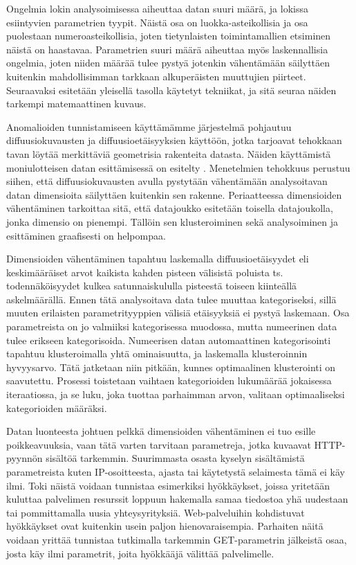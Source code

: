 Ongelmia lokin analysoimisessa aiheuttaa datan suuri määrä, ja lokissa esiintyvien parametrien tyypit. Näistä osa on luokka-asteikollisia ja osa puolestaan numeroasteikollisia, joten tietynlaisten toimintamallien 
etsiminen näistä on haastavaa. Parametrien suuri määrä aiheuttaa myös laskennallisia ongelmia, joten niiden määrää tulee pystyä jotenkin vähentämään säilyttäen kuitenkin mahdollisimman tarkkaan alkuperäisten muuttujien 
piirteet. Seuraavaksi esitetään yleisellä tasolla käytetyt tekniikat, ja sitä seuraa näiden tarkempi matemaattinen kuvaus.

Anomalioiden tunnistamiseen käyttämämme järjestelmä pohjautuu diffuusiokuvausten ja diffuusioetäisyyksien käyttöön, jotka tarjoavat tehokkaan tavan löytää merkittäviä geometrisia rakenteita datasta. Näiden
käyttämistä moniulotteisen datan esittämisessä on esitelty \cite{diff} \cite{diff2}. Menetelmien tehokkuus perustuu siihen, että diffuusiokuvausten avulla pystytään vähentämään analysoitavan datan dimensioita
säilyttäen kuitenkin sen rakenne. Periaatteessa dimensioiden vähentäminen tarkoittaa sitä, että datajoukko esitetään toisella datajoukolla, jonka dimensio on pienempi. Tällöin sen klusteroiminen sekä 
analysoiminen ja esittäminen graafisesti on helpompaa.

Dimensioiden vähentäminen tapahtuu laskemalla diffuusioetäisyydet eli keskimääräiset arvot kaikista kahden pisteen välisistä poluista ts. todennäköisyydet kulkea satunnaiskululla pisteestä toiseen kiinteällä
askelmäärällä. Ennen tätä analysoitava data tulee muuttaa kategoriseksi, sillä muuten erilaisten parametrityyppien välisiä etäisyyksiä ei pystyä laskemaan. Osa parametreista on jo valmiiksi kategorisessa 
muodossa, mutta numeerinen data tulee erikseen kategorisoida. Numeerisen datan automaattinen kategorisointi tapahtuu klusteroimalla yhtä ominaisuutta, ja laskemalla klusteroinnin hyvyysarvo. Tätä jatketaan niin pitkään,
kunnes optimaalinen klusterointi on saavutettu. Prosessi toistetaan vaihtaen kategorioiden lukumäärää jokaisessa iteraatiossa, ja se luku, joka tuottaa parhaimman arvon, valitaan optimaaliseksi kategorioiden 
määräksi.

Datan luonteesta johtuen pelkkä dimensioiden vähentäminen ei tuo esille poikkeavuuksia, vaan tätä varten tarvitaan parametreja, jotka kuvaavat HTTP-pyynnön sisältöä tarkemmin. Suurimmasta osasta kyselyn
sisältämistä parametreista kuten IP-osoitteesta, ajasta tai käytetystä selaimesta tämä ei käy ilmi. Toki näistä voidaan tunnistaa esimerkiksi hyökkäykset, joissa yritetään kuluttaa palvelimen resurssit loppuun
hakemalla samaa tiedostoa yhä uudestaan tai pommittamalla uusia yhteysyrityksiä. Web-palveluihin kohdistuvat hyökkäykset ovat kuitenkin usein paljon hienovaraisempia. Parhaiten näitä voidaan yrittää tunnistaa
tutkimalla tarkemmin GET-parametrin jälkeistä osaa, josta käy ilmi parametrit, joita hyökkääjä välittää palvelimelle. 

